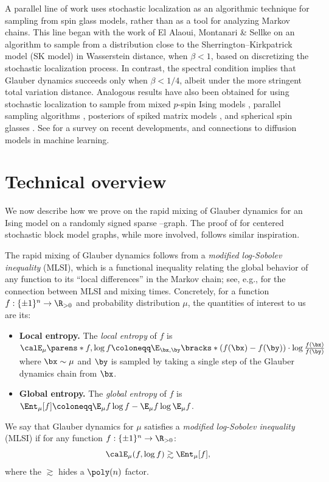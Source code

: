 \documentclass[11pt,letterpaper]{article}
\begin{document}
A parallel line of work uses stochastic localization as an algorithmic technique for sampling from spin glass models, rather than as a tool for analyzing Markov chains.
This line began with the work of El Alaoui, Montanari \& Sellke \cite{EAMS22} on an algorithm to sample from a distribution close to the Sherrington--Kirkpatrick model (SK model) in Wasserstein distance, when $\beta < 1$, based on discretizing the stochastic localization process.
In contrast, the spectral condition implies that Glauber dynamics succeeds only when $\beta < 1/4$, albeit under the more stringent total variation distance.
Analogous results have also been obtained for using stochastic localization to sample from mixed $p$-spin Ising models \cite{EAMS23}, parallel sampling algorithms \cite{AHLVXY23}, posteriors of spiked matrix models \cite{MW23}, and spherical spin glasses \cite{HMP24}.
See \cite{Mon23} for a survey on recent developments, and connections to diffusion models in machine learning.%


\section{Technical overview}\label{sec:overview}

We now describe how we prove  on the rapid mixing of Glauber dynamics for an Ising model on a randomly signed sparse \erdos--\renyi graph.
The proof of  for centered stochastic block model graphs, while more involved, follows similar inspiration.

The rapid mixing of Glauber dynamics follows from a \emph{modified log-Sobolev inequality} (MLSI), which is a functional inequality relating the global behavior of any function to its ``local differences'' in the Markov chain; see, e.g., \cite[Corollary 2.8]{bt06} for the connection between MLSI and mixing times.
Concretely, for a function $f:\{\pm1\}^n\to\R_{> 0}$ and probability distribution $\mu$, the quantities of interest to us are its:
\begin{itemize}
    \item {\bf Local entropy.}
    The \emph{local entropy} of $f$ is
    $\calE_{\mu}\parens*{f, \log f} \coloneqq \E_{\bx,\by}\bracks*{ (f(\bx) - f(\by)) \cdot \log\frac{f(\bx)}{f(\by)} }$ where $\bx\sim\mu$ and $\by$ is sampled by taking a single step of the Glauber dynamics chain from $\bx$.
    \item {\bf Global entropy.} The \emph{global entropy} of $f$ is $\Ent_{\mu}[f]\coloneqq \E_{\mu} f\log f - \E_{\mu} f \log \E_{\mu} f$.
\end{itemize}
We say that Glauber dynamics for $\mu$ satisfies a \emph{modified log-Sobolev inequality} (MLSI) if for any function $f:\{\pm1\}^n\to\R_{>0}$:
\[
    \calE_{\mu}(f,\log f) \gtrsim \Ent_{\mu}[f],
\]
where the $\gtrsim$ hides a $\poly(n)$ factor.
\end{document}
